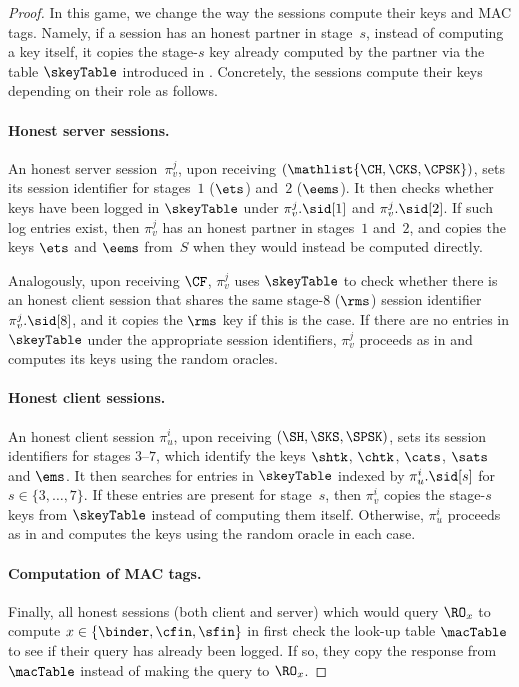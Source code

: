 \begin{proof}
	In this game, we change the way the sessions compute their keys and MAC tags.
	Namely, if a session has an honest partner in stage~$s$, instead of computing a key itself, it copies the stage-$s$ key already computed by the partner via the table $\skeyTable$ introduced in \prevGameText.
	Concretely, the sessions compute their keys depending on their role as follows.
	
	\medskip
	
	\paragraph{Honest server sessions.}
	An honest server session~$\pi_v^j$, upon receiving $(\mathlist{\CH, \CKS,\CPSK})$, sets its session identifier for stages~$1$ ($\ets$) and~$2$ ($\eems$).
	It then checks whether keys have been logged in $\skeyTable$ under $\pi_v^j.\sid[1]$ and $\pi_v^j.\sid[2]$.
	If such log entries exist, then $\pi_v^j$ has an honest partner in stages~$1$ and~$2$, and copies the keys $\ets$ and $\eems$ from~$S$ when they would instead be computed directly.
	
	Analogously, upon receiving $\CF$, $\pi_v^j$ uses $\skeyTable$ to check whether there is an honest client session that shares the same stage-$8$ ($\rms$) session identifier $\pi_v^j.\sid[8]$, and it copies the $\rms$ key if this is the case.
	If there are no entries in $\skeyTable$ under the appropriate session identifiers, $\pi_v^j$ proceeds as in \prevGameText and computes its keys using the random oracles.
	
	\paragraph{Honest client sessions.}
	An honest client session $\pi_u^i$, upon receiving $(\SH, \SKS, \SPSK)$, sets its session identifiers for stages $3$--$7$, which identify the keys $\shtk$, $\chtk$, $\cats$, $\sats$ and $\ems$. 
	It then searches for entries in $\skeyTable$ indexed by $\pi_u^i.\sid[s]$ for $s \in \{3,\dotsc,7\}$. 
	If these entries are present for stage~$s$, then $\pi_v^i$ copies the stage-$s$ keys from $\skeyTable$ instead of computing them itself.
	Otherwise, $\pi_u^i$ proceeds as in \prevGameText and computes the keys using the random oracle in each case.
	
	\paragraph{Computation of MAC tags.}
	Finally, all honest sessions (both client and server) which would query $\RO_x$ to compute $x \in \{\binder, \cfin, \sfin\}$ in \prevGameText first check the look-up table $\macTable$ to see if their query has already been logged.
	If so, they copy the response from $\macTable$ instead of making the query to $\RO_x$.
	

\end{proof}
